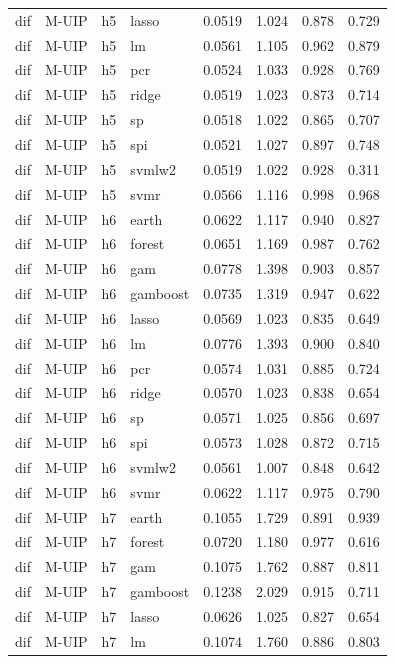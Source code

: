 \begin{ThreePartTable}
\begin{longtable}[t]{llclcccc}
dif & M-UIP & h5 & lasso & 0.0519 & 1.024 & 0.878 & 0.729\\
dif & M-UIP & h5 & lm & 0.0561 & 1.105 & 0.962 & 0.879\\
dif & M-UIP & h5 & pcr & 0.0524 & 1.033 & 0.928 & 0.769\\
dif & M-UIP & h5 & ridge & 0.0519 & 1.023 & 0.873 & 0.714\\
dif & M-UIP & h5 & sp & 0.0518 & 1.022 & 0.865 & 0.707\\
dif & M-UIP & h5 & spi & 0.0521 & 1.027 & 0.897 & 0.748\\
dif & M-UIP & h5 & svmlw2 & 0.0519 & 1.022 & 0.928 & 0.311\\
dif & M-UIP & h5 & svmr & 0.0566 & 1.116 & 0.998 & 0.968\\
\addlinespace
dif & M-UIP & h6 & earth & 0.0622 & 1.117 & 0.940 & 0.827\\
dif & M-UIP & h6 & forest & 0.0651 & 1.169 & 0.987 & 0.762\\
dif & M-UIP & h6 & gam & 0.0778 & 1.398 & 0.903 & 0.857\\
dif & M-UIP & h6 & gamboost & 0.0735 & 1.319 & 0.947 & 0.622\\
dif & M-UIP & h6 & lasso & 0.0569 & 1.023 & 0.835 & 0.649\\
dif & M-UIP & h6 & lm & 0.0776 & 1.393 & 0.900 & 0.840\\
dif & M-UIP & h6 & pcr & 0.0574 & 1.031 & 0.885 & 0.724\\
dif & M-UIP & h6 & ridge & 0.0570 & 1.023 & 0.838 & 0.654\\
dif & M-UIP & h6 & sp & 0.0571 & 1.025 & 0.856 & 0.697\\
dif & M-UIP & h6 & spi & 0.0573 & 1.028 & 0.872 & 0.715\\
dif & M-UIP & h6 & svmlw2 & 0.0561 & 1.007 & 0.848 & 0.642\\
dif & M-UIP & h6 & svmr & 0.0622 & 1.117 & 0.975 & 0.790\\
\addlinespace
dif & M-UIP & h7 & earth & 0.1055 & 1.729 & 0.891 & 0.939\\
dif & M-UIP & h7 & forest & 0.0720 & 1.180 & 0.977 & 0.616\\
dif & M-UIP & h7 & gam & 0.1075 & 1.762 & 0.887 & 0.811\\
dif & M-UIP & h7 & gamboost & 0.1238 & 2.029 & 0.915 & 0.711\\
dif & M-UIP & h7 & lasso & 0.0626 & 1.025 & 0.827 & 0.654\\
dif & M-UIP & h7 & lm & 0.1074 & 1.760 & 0.886 & 0.803\\

\end{longtable}
\end{ThreePartTable}

